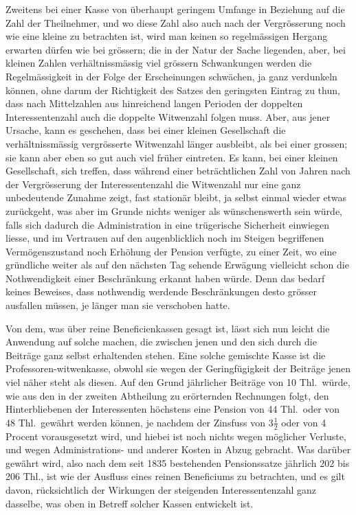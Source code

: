 \documentclass[12pt,a4paper]{article}
\begin{document}
Zweitens bei einer Kasse von \"uberhaupt geringem Umfange in Beziehung auf die Zahl der Theilnehmer, und wo diese Zahl also auch nach der Vergr\"osserung noch wie eine kleine zu betrachten ist, wird man keinen so regelm\"assigen Hergang erwarten d\"urfen wie bei gr\"ossern; die in der Natur der Sache liegenden, aber, bei kleinen Zahlen verh\"altnissm\"assig viel gr\"ossern Schwankungen werden die Regelm\"assigkeit in der Folge der Erscheinungen schw\"achen, ja ganz verdunkeln k\"onnen, ohne darum der Richtigkeit des Satzes den geringsten Eintrag zu thun, dass nach Mittelzahlen aus hinreichend langen Perioden der doppelten Interessentenzahl auch die doppelte Witwenzahl folgen muss. Aber, aus jener Ursache, kann es geschehen, dass bei einer kleinen Gesellschaft die verh\"altnissm\"assig vergr\"osserte Witwenzahl l\"anger ausbleibt, als bei einer grossen; sie kann aber eben so gut auch viel fr\"uher eintreten. Es kann, bei einer kleinen Gesellschaft, sich treffen, dass w\"ahrend einer betr\"achtlichen Zahl von Jahren nach der Vergr\"osserung der Interessentenzahl die Witwenzahl nur eine ganz unbedeutende Zunahme zeigt, fast station\"ar bleibt, ja selbst einmal wieder etwas zur\"uckgeht, was aber im Grunde nichts weniger als w\"unschenswerth sein w\"urde, falls sich dadurch die Administration in eine tr\"ugerische Sicherheit einwiegen liesse, und im Vertrauen auf den augenblicklich noch im Steigen begriffenen Verm\"ogenszustand noch Erh\"ohung der Pension verf\"ugte, zu einer Zeit, wo eine gr\"undliche weiter als auf den n\"achsten Tag sehende Erw\"agung vielleicht schon die Nothwendigkeit einer Beschr\"ankung erkannt haben w\"urde. Denn das bedarf keines Beweises, dass nothwendig werdende Beschr\"ankungen desto gr\"osser ausfallen m\"ussen, je l\"anger man sie verschoben hatte.

Von dem, was \"uber reine Beneficienkassen gesagt ist, l\"asst sich nun leicht die Anwendung auf solche machen, die zwischen jenen und den sich durch die Beitr\"age ganz selbst erhaltenden stehen. Eine solche gemischte Kasse ist die Professoren-witwenkasse, obwohl sie wegen der Geringf\"ugigkeit der Beitr\"age jenen viel n\"aher steht als diesen. Auf den Grund j\"ahrlicher Beitr\"age von 10 Thl.\ w\"urde, wie aus den in der zweiten Abtheilung zu er\"orternden Rechnungen folgt, den Hinterbliebenen der Interessenten h\"ochstens eine Pension von 44 Thl.\ oder von 48 Thl.\ gew\"ahrt werden k\"onnen, je nachdem der Zinsfuss von $3\frac{1}{2}$ oder von 4 Procent vorausgesetzt wird, und hiebei ist noch nichts wegen m\"oglicher Verluste, und wegen Administrations- und anderer Kosten in Abzug gebracht. Was dar\"uber gew\"ahrt wird, also nach dem seit 1835 bestehenden Pensionssatze j\"ahrlich 202 bis 206 Thl., ist wie der Ausfluss eines reinen Beneficiums zu betrachten, und es gilt davon, r\"ucksichtlich der Wirkungen der steigenden Interessentenzahl ganz dasselbe, was oben in Betreff solcher Kassen entwickelt ist.
\end{document}
